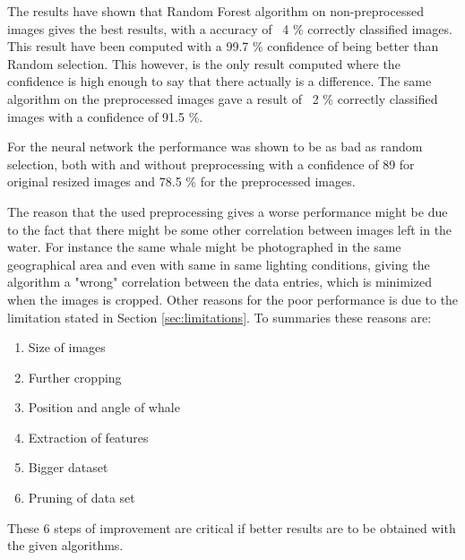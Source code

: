 
The results have shown that Random Forest algorithm on non-preprocessed images gives the best results, with a accuracy of ~4 \% correctly classified images. This result have been computed with a 99.7 \% confidence of being better than Random selection. This however, is the only result computed where the confidence is high enough to say that there actually is a difference.
The same algorithm on the preprocessed images gave a result of ~2 \% correctly classified images with a confidence of 91.5 \%.

For the neural network the performance was shown to be as bad as random selection, both with and without preprocessing with a confidence of 89 for original resized images and 78.5 \% for the preprocessed images.

The reason that the used preprocessing gives a worse performance might be due to the fact that there might be some other correlation between images left in the water. For instance the same whale might be photographed in the same geographical area and even with same in same lighting conditions, giving the algorithm a "wrong"  correlation between the data entries, which is minimized when the images is cropped.
Other reasons for the poor performance is due to the limitation stated in Section \ref{sec:limitations}.
To summaries these reasons are:
\begin{enumerate}
\item Size of images 
\item Further cropping
\item Position and angle of whale
\item Extraction of features
\item Bigger dataset
\item Pruning of data set
\end{enumerate}
These 6 steps of improvement are critical if better results are to be obtained with the given algorithms. 

